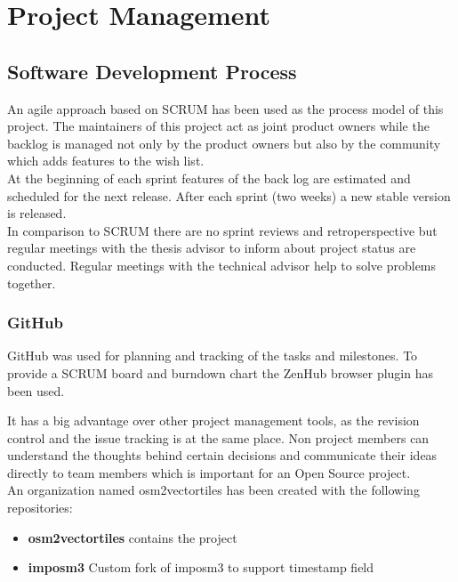 \chapter{Project Management}\label{project-management}

\section{Software Development Process}


An agile approach based on SCRUM has been used as the process model of this project.
The maintainers of this project act as joint product owners while the backlog is managed not only
by the product owners but also by the community which adds features to the wish list.\\

At the beginning of each sprint features of the back log are estimated and scheduled for the
next release. After each sprint (two weeks) a new stable version is released. \\

In comparison to SCRUM there are no sprint reviews and retroperspective but regular meetings with
the thesis advisor to inform about project status are conducted. Regular meetings with the technical advisor help to solve problems together.

\subsection{GitHub}\label{github}
GitHub was used for planning and tracking of the tasks and milestones.
To provide a SCRUM board and burndown chart the ZenHub browser plugin has been used.


It has a big advantage over other project management tools, as the revision control and the issue tracking is at the same place.
Non project members can understand the thoughts behind certain decisions and communicate their ideas directly to team members which is important for an Open Source project.\\

An organization named osm2vectortiles has been created with the following repositories:

\begin{itemize}
\item
  \textbf{osm2vectortiles} contains the project
\item
  \textbf{imposm3} Custom fork of imposm3 to support timestamp field
\end{itemize}

